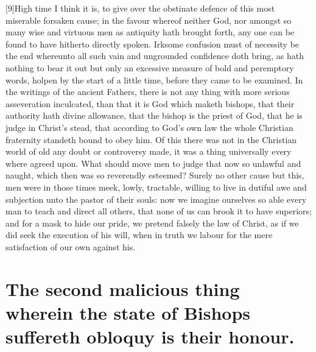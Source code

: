 [9]High time I think it is, to give over the obstinate defence of this most miserable forsaken cause; in the favour whereof neither God, nor amongst so many wise and virtuous men as antiquity hath brought forth, any one can be found to have hitherto directly spoken. Irksome confusion must of  necessity be the end whereunto all such vain and ungrounded confidence doth bring, as hath nothing to bear it out but only an excessive measure of bold and peremptory words, holpen by the start of a little time, before they came to be examined. In the writings of the ancient Fathers, there is not any thing with more serious asseveration inculcated, than that it is God which maketh bishops, that their authority hath divine allowance, that the bishop is the priest of God, that he is judge in Christ’s stead, that according to God’s own law the whole Christian fraternity standeth bound to obey him. Of this there was not in the Christian world of old any doubt or controversy made, it was a thing universally every where agreed upon. What should move men to judge that now so unlawful and naught, which then was so reverendly esteemed? Surely no other cause but this, men were in those times meek, lowly, tractable, willing to live in dutiful awe and subjection unto the pastor of their souls: now we imagine ourselves so able every man to teach and direct all others, that none of us can brook it to have superiors; and for a mask to hide our pride, we pretend falsely the law of Christ, as if we did seek the execution of his will, when in truth we labour for the mere satisfaction of our own against his.

\section*{The second malicious thing wherein the state of Bishops suffereth obloquy is their honour.}

